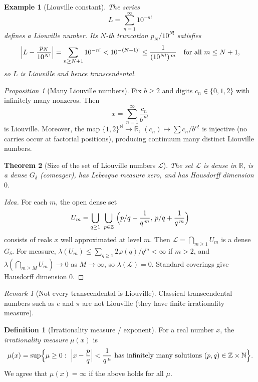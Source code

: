 \documentclass[11pt,a4paper]{article}
\newtheorem{theorem}{Theorem}
\newtheorem{example}{Example}
\theoremstyle{definition}
\theoremstyle{definition}
\newtheorem{definition}[exercise]{Definition}
\theoremstyle{plain}
\theoremstyle{remark}
\newtheorem{remark}[exercise]{Remark}
\newtheorem{proposition}[theorem]{Proposition}
\begin{document}
\begin{example}[Liouville constant]
	The series
	\[
	L=\sum_{n=1}^{\infty}10^{-n!}
	\]
	defines a Liouville number. Its $N$-th truncation $p_N/10^{N!}$ satisfies
	\[
	\Bigl|L-\frac{p_N}{10^{N!}}\Bigr|
	=\sum_{n\ge N+1}10^{-n!}
	<10^{-(N+1)!}
	\le \frac{1}{(10^{N!})^{\,m}}
	\quad\text{for all }m\le N+1,
	\]
	so $L$ is Liouville and hence transcendental.
\end{example}

\begin{proposition}[Many Liouville numbers]
	Fix $b\ge2$ and digits $c_n\in\{0,1,2\}$ with infinitely many nonzeros. Then
	\[
	x=\sum_{n=1}^{\infty}\frac{c_n}{b^{\,n!}}
	\]
	is Liouville. Moreover, the map $\{1,2\}^{\mathbb N}\to\mathbb R$,
	$(c_n)\mapsto\sum c_n/b^{n!}$ is injective (no carries occur at factorial positions), producing continuum many distinct Liouville numbers.
\end{proposition}

\begin{theorem}[Size of the set of Liouville numbers $\mathcal L$]
	The set $\mathcal L$ is dense in $\mathbb R$, is a dense $G_\delta$ (comeager), has Lebesgue measure zero, and has Hausdorff dimension $0$.
\end{theorem}

\begin{proof}[Idea]
	For each $m$, the open dense set
	\[
	U_m=\bigcup_{q\ge1}\ \bigcup_{p\in\mathbb Z}\ \Bigl(p/q-\frac{1}{q^{\,m}},\,p/q+\frac{1}{q^{\,m}}\Bigr)
	\]
	consists of reals $x$ well approximated at level $m$. Then $\mathcal L=\bigcap_{m\ge1}U_m$ is a dense $G_\delta$.
	For measure, $\lambda(U_m)\le \sum_{q\ge1}2\varphi(q)/q^m<\infty$ if $m>2$, and $\lambda(\bigcap_{m\ge M}U_m)\to0$ as $M\to\infty$, so $\lambda(\mathcal L)=0$.
	Standard coverings give Hausdorff dimension $0$.
\end{proof}

\begin{remark}[Not every transcendental is Liouville]
	Classical transcendental numbers such as $e$ and $\pi$ are not Liouville (they have finite irrationality measure).
\end{remark}


\begin{definition}[Irrationality measure / exponent]
	For a real number $x$, the \emph{irrationality measure} $\mu(x)$ is
	\[
	\mu(x)
	=\sup\Bigl\{\mu\ge0:\ \Bigl|x-\frac{p}{q}\Bigr|<\frac{1}{q^{\,\mu}}
	\text{ has infinitely many solutions }(p,q)\in\mathbb Z\times\mathbb N\Bigr\}.
	\]
	We agree that $\mu(x)=\infty$ if the above holds for all $\mu$.
\end{definition}
\end{document}
